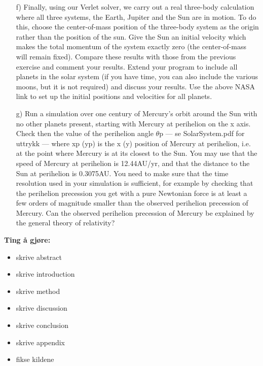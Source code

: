\documentclass{article}
\begin{document}
\begin{itemize}
    \item[f)] Finally, using our Verlet solver, we carry out a real three-body calculation where all three systems, the Earth, Jupiter and the Sun are in motion. To do this, choose the center-of-mass position of the three-body system as the origin rather than the position of the sun. Give the Sun an initial velocity which makes the total momentum of the system exactly zero (the center-of-mass will remain fixed). Compare these results with those from the previous exercise and comment your results. Extend your program to include all planets in the solar system (if you have time, you can also include the various moons, but it is not required) and discuss your results. Use the above NASA link to set up the initial positions and velocities for all planets. \\
    \item[g)] Run a simulation over one century of Mercury’s orbit around the Sun with no other planets present, starting with Mercury at perihelion on the x axis. Check then the value of the perihelion angle $\theta$p --- se SolarSystem.pdf for uttrykk --- where xp (yp) is the x (y) position of Mercury at perihelion, i.e. at the point where Mercury is at its closest to the Sun. You may use that the speed of Mercury at perihelion is 12.44AU/yr, and that the distance to the Sun at perihelion is 0.3075AU. You need to make sure that the time resolution used in your simulation is sufficient, for example by checking that the perihelion precession you get with a pure Newtonian force is at least a few orders of magnitude smaller than the observed perihelion precession of Mercury. Can the observed perihelion precession of Mercury be explained by the general theory of relativity? \\
\end{itemize}

\textbf{Ting å gjøre:}
\begin{itemize}
    \item skrive abstract \\
    \item skrive introduction \\
    \item skrive method \\
    \item skrive discussion \\
    \item skrive conclusion \\
    \item skrive appendix \\
    \item fikse kildene \\

\end{itemize}
\end{document}
